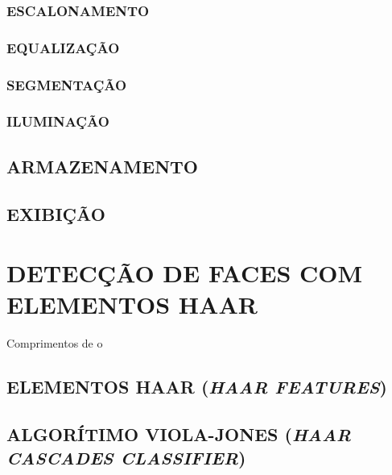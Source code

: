 \subsubsection{ESCALONAMENTO}\label{subsubsec:escalonamento}

\subsubsection{EQUALIZAÇÃO}\label{subsubsec:equalizacao}

\subsubsection{SEGMENTAÇÃO}\label{subsubsec:segmentacao}

\subsubsection{ILUMINAÇÃO}\label{subsubsec:iluminacao}

\subsection{ARMAZENAMENTO}\label{subsubsec:armazenamento}

\subsection{EXIBIÇÃO}\label{subsubsec:exibicao}




\section{DETECÇÃO DE FACES COM ELEMENTOS HAAR}\label{sec:detecao_faces}

Comprimentos de o


\subsection{ELEMENTOS HAAR (\textit{HAAR FEATURES}) }\label{subsubsec:elem_haar}


\subsection{ALGORÍTIMO VIOLA-JONES (\textit{HAAR CASCADES CLASSIFIER}) }\label{subsubsec:violajones}





